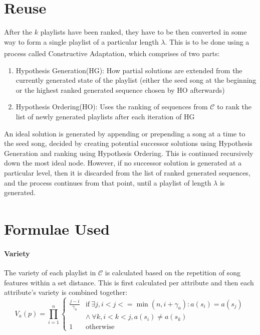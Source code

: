 \documentclass[a4paper, 12pt]{report}
\begin{document}
\section{Reuse}
After the \(k\) playlists have been ranked, they have to be then converted in some way to form a single playlist of a particular length \(\lambda\). 
This is to be done using a process called Constructive Adaptation\textsuperscript{\cite{constructive-adaptation}}, which comprises of two parts:
\begin{enumerate}
    \item Hypothesis Generation(HG): How partial solutions are extended from the currently generated state of the playlist 
    (either the seed song at the beginning or the highest ranked generated sequence chosen by HO afterwards)
    \item Hypothesis Ordering(HO): Uses the ranking of sequences from \(\mathcal{C}\) to rank the list of newly generated playlists after each iteration of HG
\end{enumerate}
An ideal solution is generated by appending or prepending a song at a time to the seed song, decided by creating potential successor 
solutions using Hypothesis Generation and ranking using Hypothesis Ordering. 
This is continued recursively down the most ideal node. However, if no successor solution is generated at a particular level, then it is discarded from the 
list of ranked generated sequences, and the process continues from that point, until a playlist of length \(\lambda\) is generated.

\section{Formulae Used\textsuperscript{\cite[pp. 5--10]{main}}}
\paragraph{Variety}
The variety of each playlist in \(\mathcal{C}\) is calculated based on the repetition of song features within a set distance. 
This is first calculated per attribute and then each attribute's variety is combined together:
\begin{equation}
V_a(p) = \prod_{i=1}^n
\begin{cases}
    \frac{j-i}{\gamma_a} & \text{if}\ \exists j, i < j <= \min(n, i+\gamma_a) : a(s_i) = a(s_j) \\
    & \wedge\ \forall k, i < k < j, a(s_i) \neq a(s_k) \\
    1 & \text{otherwise}
\end{cases}
\end{equation}
\end{document}
